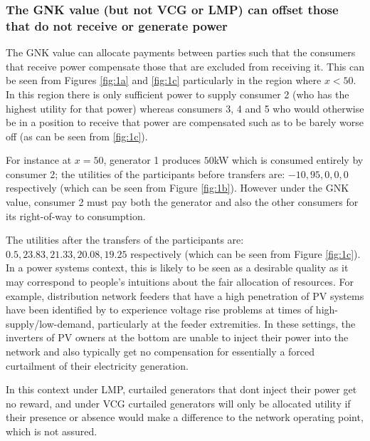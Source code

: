 \subsubsection*{The GNK value (but not VCG or LMP) can offset those that do not receive or generate power}
The GNK value can allocate payments between parties such that the consumers that receive power compensate those that are excluded from receiving it.
This can be seen from Figures \ref{fig:1a} and \ref{fig:1c} particularly in the region where $x<50$.
In this region there is only sufficient power to supply consumer 2 (who has the highest utility for that power) whereas consumers 3, 4 and 5 who would otherwise be in a position to receive that power are
compensated such as to be barely worse off (as can be seen from \ref{fig:1c}).

For instance at $x=50$, generator 1 produces $50$kW which is consumed entirely by consumer 2; the utilities of the participants before transfers are: $-10, 95, 0, 0, 0$ respectively (which can be seen from Figure \ref{fig:1b}).
However under the GNK value, consumer 2 must pay both the generator and also the other consumers for its right-of-way to consumption.

The utilities after the transfers of the participants are: $0.5, 23.83, 21.33, 20.08, 19.25$ respectively (which can be seen from Figure \ref{fig:1c}).
In a power systems context, this is likely to be seen as a desirable quality as it may correspond to people's intuitions about the fair allocation of resources.
For example, distribution network feeders that have a high penetration of PV systems have been identified by \cite{feeder1} to experience voltage rise problems at 
times of high-supply/low-demand, particularly at the feeder extremities. 
In these settings, the inverters of PV owners at the bottom are unable to inject their power into the network and also typically get no compensation for essentially a forced curtailment of their electricity generation.

In this context under LMP, curtailed generators that dont inject their power get no reward, and under VCG curtailed generators will only be allocated utility if their presence or absence would make a difference to the network operating point, which is not assured.
\DIFaddbegin {}\DIFaddend 

